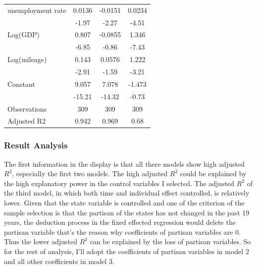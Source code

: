 \begin{table}[htbp]
\begin{tabular}{p{6.93em}ccc}
        unemployment rate             & 0.0136                                & -0.0151                             & 0.0234                               \\
        \multicolumn{1}{c}{}          & -1.97                                 & -2.27                               & -4.51                                \\
        Log(GDP)                      & 0.807                                 & -0.0855                             & 1.346                                \\
        \multicolumn{1}{c}{}          & -6.85                                 & -0.86                               & -7.43                                \\
        Log(mileage)                  & 0.143                                 & 0.0576                              & 1.222                                \\
        \multicolumn{1}{c}{}          & -2.91                                 & -1.59                               & -3.21                                \\
        Constant                      & 9.057                                 & 7.078                               & -1.473                               \\
        \multicolumn{1}{c}{}          & -15.21                                & -14.32                              & -0.73                                \\
        \midrule
        Observations                  & 309                                   & 309                                 & 309                                  \\
        Adjusted R2                   & 0.942                                 & 0.969                               & 0.68                                 \\
        \bottomrule
    \end{tabular}%
    \label{Table 2.8}%
\end{table}%

\subsubsection{Result Analysis}
The first information in the display is that all there models show high adjusted $R^2$, especially the first two models. The high adjusted $R^2$ could be explained by the high explanatory power in the control variables I selected. The adjusted $R^2$ of the third model, in which both time and individual effect controlled, is relatively lower. Given that the state variable is controlled and one of the criterion of the sample selection is that the partisan of the states has not changed in the past 19 years, the deduction process in the fixed effected regression would delete the partisan variable that's the reason why coefficients of partisan variables are 0. Thus the lower adjusted $R^2$ can be explained by the loss of partisan variables. So for the rest of analysis, I'll adopt the coefficients of partisan variables in model 2 and all other coefficients in model 3.

